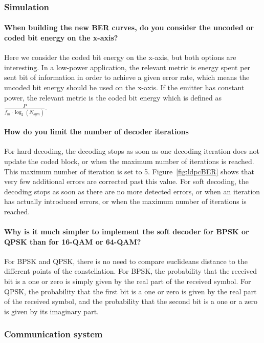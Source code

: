 \subsubsection{Simulation}
\paragraph{When building the new BER curves, do you consider the uncoded or coded bit energy on the x-axis?}
Here we consider the coded bit energy on the x-axis, but both options are interesting.
In a low-power application, the relevant metric is energy spent per sent bit of information in order to achieve a given error rate, which means the uncoded bit energy should be used on the x-axis.
If the emitter has constant power, the relevant metric is the coded bit energy which is defined as $\frac{P}{f_m \cdot \log_2(N_{sym})}$.

\paragraph{How do you limit the number of decoder iterations}
For hard decoding, the decoding stops as soon as one decoding iteration does not update the coded block, or when the maximum number of iterations is reached. This maximum number of iteration is set to 5. Figure~\ref{fig:ldpcBER} shows that very few additional errors are corrected past this value.
For soft decoding, the decoding stops as soon as there are no more detected errors, or when an iteration has actually introduced errors, or when the maximum number of iterations is reached.

\paragraph{Why is it much simpler to implement the soft decoder for BPSK or QPSK than for 16-QAM or 64-QAM?}
For BPSK and QPSK, there is no need to compare euclideans distance to the different points of the constellation. For BPSK, the probability that the received bit is a one or zero is simply given by the real part of the received symbol. For QPSK, the probability that the first bit is a one or zero is given by the real part of the received symbol, and the probability that the second bit is a one or a zero is given by its imaginary part.

\subsubsection{Communication system}
